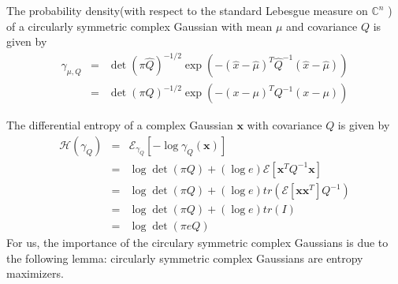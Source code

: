\documentclass[10pt,a4paper,UTF8]{article}
\begin{document}
The probability density(with respect to the standard Lebesgue measure on \(\mathbb{C}^{n}\) ) of a circularly symmetric complex Gaussian with mean \(\mu\) and covariance \(Q\) is given by 
\begin{eqnarray}
  \label{eq:20120323gamma}
  \gamma_{\mu,Q} &=& \det(\pi \hat{Q})^{-1/2} \exp(-(\hat{x} - \hat{\mu})^{T}\hat{Q}^{-1}(\hat{x} -\hat{\mu}) ) \nonumber \\
               &=& \det(\pi  {Q})^{-1/2} \exp(-( {x} -  {\mu})^{T} {Q}^{-1}( {x} - {\mu}) ) 
\end{eqnarray}

The differential entropy of a complex Gaussian \(\mathbf{x}\) with covariance \(Q\) is given by
\begin{eqnarray}
  \label{eq:20120323hgammaq}
  \mathcal{H}(\gamma_Q) &=& \mathcal{E}_{\gamma_Q}[-\log\gamma_Q(\mathbf{x})] \nonumber \\
                        &=& \log \det(\pi Q) + (\log e)\mathcal{E}[\mathbf{x}^{T}Q^{-1}\mathbf{x}] \nonumber \\
                        &=& \log \det(\pi Q) + (\log e)tr(\mathcal{E}[\mathbf{x}\mathbf{x}^{T}]Q^{-1}) \nonumber \\
                        &=& \log \det(\pi Q) + (\log e)tr(I)                 \nonumber \\
                        &=& \log \det(\pi eQ)
\end{eqnarray}
For us, the importance of the circulary symmetric complex Gaussians is due to the following lemma: circularly symmetric complex Gaussians are entropy maximizers. 
\end{document}
